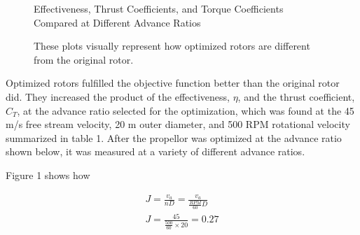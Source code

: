 \documentclass{article}
\begin{document}
\begin{figure}
  \centering

  \hspace{1em}
  \caption{Effectiveness, Thrust Coefficients, and Torque Coefficients Compared at Different Advance Ratios}
  \captionsetup{aboveskip=0pt,font=it}
  \caption*{These plots visually represent how optimized rotors are different from the original rotor.}
  \label{fig:1}
\end{figure}

Optimized rotors fulfilled the objective function better than the original rotor did. They increased the product of the effectiveness, $\eta$, and the thrust coefficient, $C_{T}$, at the advance ratio selected for the optimization, which was found at the 45 m/s free stream velocity, 20 m outer diameter, and 500 RPM rotational velocity summarized in table 1. After the propellor was optimized at the advance ratio shown below, it was measured at a variety of different advance ratios. \newline \break

Figure 1 shows how 

\begin{equation}
\begin{aligned}
	J = \frac{v_{a}}{nD} = \frac{v_{a}}{\frac{RPM}{60}D} \\
	J = \frac{45}{\frac{500}{60} \times 20} = 0.27 \\
\end{aligned}
\end{equation} 
\end{document}
